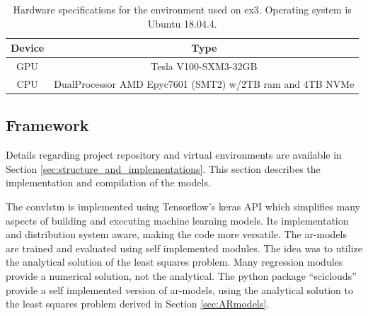 \begin{table}[ht]
    \centering
    \begin{tabular}{c|c}
        Device &  Type  \\ \hline
        GPU & Tesla V100-SXM3-32GB \\
        CPU & DualProcessor AMD Epyc7601 (SMT2) w/2TB ram and 4TB NVMe 
    \end{tabular}
    \caption{Hardware specifications for the environment used on \acrshort{ex3}. Operating system is Ubuntu 18.04.4.}
    \label{tab:hardware_ex3}
\end{table}

\subsection{Framework} \label{sec:framework}
Details regarding project repository and virtual environments are available in Section \ref{sec:structure_and_implementations}. This section describes the implementation and compilation of the models.

The \acrshort{convlstm} is implemented using Tensorflow's keras API which simplifies many aspects of building and executing machine learning models. Its implementation and distribution system aware, making the code more versatile. %
The \acrshort{ar}-models are trained and evaluated using self implemented modules. The idea was to utilize the analytical solution of the least squares problem. Many regression modules provide a numerical solution, not the analytical. The python package ``sciclouds'' provide a self implemented version of \acrshort{ar}-models, using the analytical solution to the least squares problem derived in Section \ref{sec:ARmodels}.


